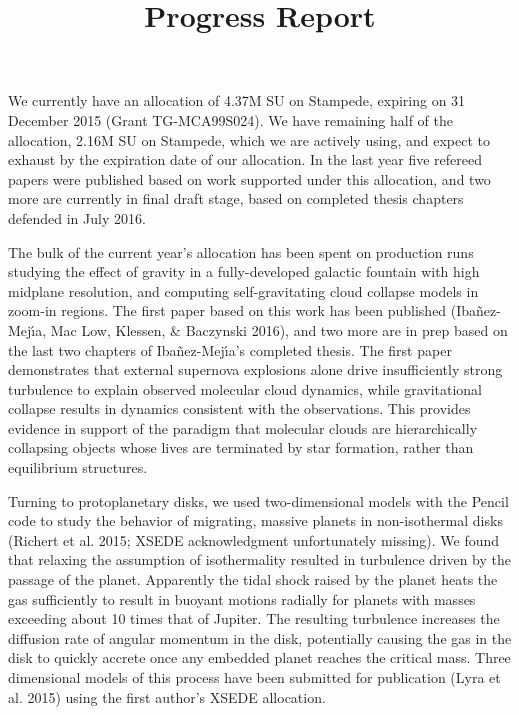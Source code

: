 \documentclass[12pt,preprint]{aastex}
\title{Progress Report}
\begin{document}
\maketitle
We currently have an allocation of 4.37M SU on Stampede, expiring on 31 December 2015 (Grant TG-MCA99S024).  We have remaining half of the allocation, 2.16M SU on Stampede, which we are actively using, and expect to exhaust by the expiration date of our allocation.  In the last year five refereed papers were published based on work supported under this allocation, and two more are currently in final draft stage, based on completed thesis chapters defended in July 2016.

The bulk of the current year's allocation has been spent on production runs studying the effect of gravity in a fully-developed galactic fountain with high midplane resolution, and computing self-gravitating cloud collapse models in zoom-in regions.  The first paper based on this work has been published (Iba\~nez-Mej\'{\i}a, Mac Low, Klessen, \& Baczynski 2016), and two more are in prep based on the last two chapters of Iba\~nez-Mej\'{\i}a's completed thesis. The first paper demonstrates that external supernova explosions alone drive insufficiently strong turbulence to explain observed molecular cloud dynamics, while gravitational collapse results in dynamics consistent with the observations. This provides evidence in support of the paradigm that molecular clouds are hierarchically collapsing objects whose lives are terminated by star formation, rather than equilibrium structures.


Turning to protoplanetary disks, we used two-dimensional models with the Pencil code to study the behavior of migrating, massive planets in non-isothermal disks (Richert et al. 2015; XSEDE acknowledgment unfortunately missing).  We found that relaxing the assumption of isothermality resulted in turbulence driven by the passage of the planet. Apparently the tidal shock raised by the planet heats the gas sufficiently to result in buoyant motions radially for planets with masses exceeding about 10 times that of Jupiter.  The resulting turbulence increases the diffusion rate of angular momentum in the disk, potentially causing the gas in the disk to quickly accrete once any embedded planet reaches the critical mass.  Three dimensional models of this process have been submitted for publication (Lyra et al. 2015) using the first author's XSEDE allocation.
\end{document}
